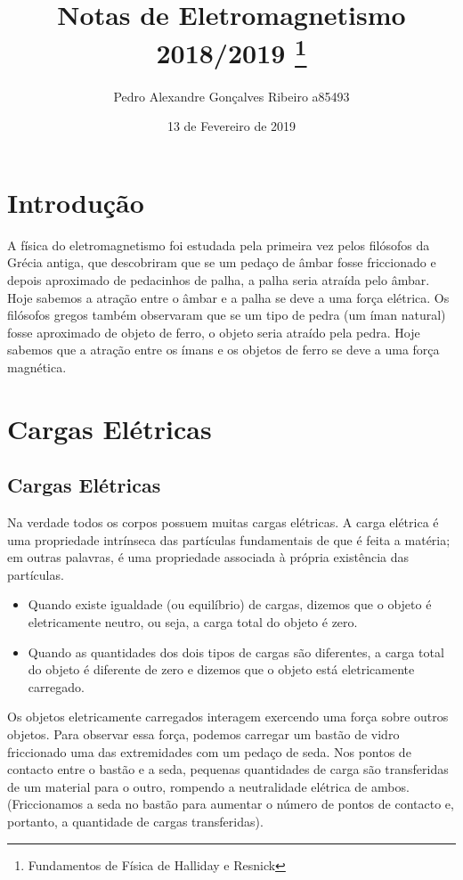 \documentclass{article}
\title{Notas de Eletromagnetismo 2018/2019 \thanks{Fundamentos de Física de Halliday e Resnick}}
\author{Pedro Alexandre Gonçalves Ribeiro a85493}
\date{13 de Fevereiro de 2019}
\begin{document}
\maketitle
\tableofcontents
\newpage
\section{Introdução}
A física do eletromagnetismo foi estudada pela primeira vez pelos filósofos da Grécia antiga, que descobriram que se um pedaço de âmbar fosse friccionado e depois aproximado de pedacinhos de palha, a palha seria atraída pelo âmbar. Hoje sabemos a atração entre o âmbar e a palha se deve a uma força elétrica. Os filósofos gregos também observaram que se um tipo de pedra (um íman natural) fosse aproximado de objeto de ferro, o objeto seria atraído pela pedra. Hoje sabemos que a atração entre os ímans e os objetos de ferro se deve a uma força magnética.

\section{Cargas Elétricas}
\subsection{Cargas Elétricas}
Na verdade todos os corpos possuem muitas cargas elétricas. A carga elétrica é uma propriedade intrínseca das partículas fundamentais de que é feita a matéria; em outras palavras, é uma propriedade associada à própria existência das partículas.
\begin{itemize}
\item Quando existe igualdade (ou equilíbrio) de cargas, dizemos que o objeto é eletricamente neutro, ou seja, a carga total do objeto é zero.
\item Quando as quantidades dos dois tipos de cargas são diferentes, a carga total do objeto é diferente de zero e dizemos que o objeto está eletricamente carregado.
\end{itemize}
Os objetos eletricamente carregados interagem exercendo uma força sobre outros objetos. Para observar essa força, podemos carregar um bastão de vidro friccionado uma das extremidades com um pedaço de seda. Nos pontos de contacto entre o bastão e a seda, pequenas quantidades de carga são transferidas de um material para o outro, rompendo a neutralidade elétrica de ambos. (Friccionamos a seda no bastão para aumentar o número de pontos de contacto e, portanto, a quantidade de cargas transferidas).
\end{document}
